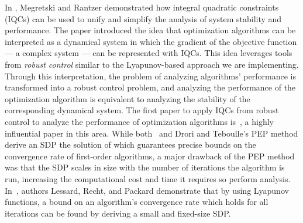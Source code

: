 
In \cite{iqc}, Megretski and Rantzer demonstrated how integral quadratic constraints (IQCs) can be used to unify and simplify the analysis of system stability and performance. The paper introduced the idea that optimization algorithms can be interpreted as a dynamical system in which the gradient of the objective function --- a complex system --- can be represented with IQCs. This idea leverages tools from \textit{robust control} similar to the Lyapunov-based approach we are implementing. Through this interpretation, the problem of analyzing algorithms' performance is transformed into a robust control problem, and analyzing the performance of the optimization algorithm is equivalent to analyzing the stability of the corresponding dynamical system. The first paper to apply IQCs from robust control to analyze the performance of optimization algorithms is~\cite{lessard2016}, a highly influential paper in this area. While both~\cite{lessard2016} and Drori and Teboulle's PEP method derive an SDP the solution of which guarantees precise bounds on the convergence rate of first-order algorithms, a major drawback of the PEP method was that the SDP scales in size with the number of iterations the algorithm is run, increasing the computational cost and time it requires so perform analysis. In~\cite{lessard2016}, authors Lessard, Recht, and Packard demonstrate that by using Lyapunov functions, a bound on an algorithm's convergence rate which holds for all iterations can be found by deriving a small and fixed-size SDP.


